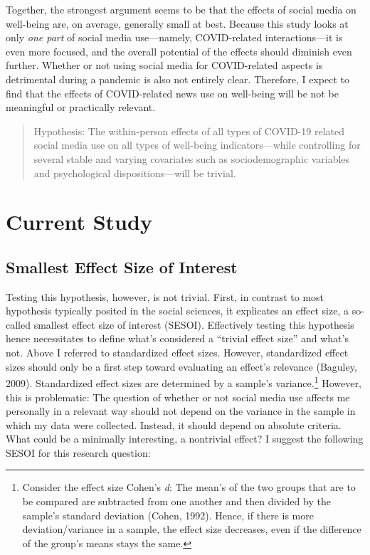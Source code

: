 \documentclass[
  english,
  man,floatsintext]{apa6}
\begin{document}
Together, the strongest argument seems to be that the effects of social media on well-being are, on average, generally small at best.
Because this study looks at only \emph{one part} of social media use---namely, COVID-related interactions---it is even more focused, and the overall potential of the effects should diminish even further.
Whether or not using social media for COVID-related aspects is detrimental during a pandemic is also not entirely clear.
Therefore, I expect to find that the effects of COVID-related news use on well-being will be not be meaningful or practically relevant.

\begin{quote}
Hypothesis: The within-person effects of all types of COVID-19 related social media use on all types of well-being indicators---while controlling for several stable and varying covariates such as sociodemographic variables and psychological dispositions---will be trivial.
\end{quote}

\hypertarget{current-study}{%
\section{Current Study}\label{current-study}}

\hypertarget{smallest-effect-size-of-interest}{%
\subsection{Smallest Effect Size of Interest}\label{smallest-effect-size-of-interest}}

Testing this hypothesis, however, is not trivial.
First, in contrast to most hypothesis typically posited in the social sciences, it explicates an effect size, a so-called smallest effect size of interest (SESOI).
Effectively testing this hypothesis hence necessitates to define what's considered a ``trivial effect size'' and what's not.
Above I referred to standardized effect sizes.
However, standardized effect sizes should only be a first step toward evaluating an effect's relevance (Baguley, 2009).
Standardized effect sizes are determined by a sample's variance.\footnote{Consider the effect size Cohen's \emph{d}: The mean's of the two groups that are to be compared are subtracted from one another and then divided by the sample's standard deviation (Cohen, 1992). Hence, if there is more deviation/variance in a sample, the effect size decreases, even if the difference of the group's means stays the same.}
However, this is problematic: The question of whether or not social media use affects me personally in a relevant way should not depend on the variance in the sample in which my data were collected.
Instead, it should depend on absolute criteria.
What could be a minimally interesting, a nontrivial effect?
I suggest the following SESOI for this research question:
\end{document}
